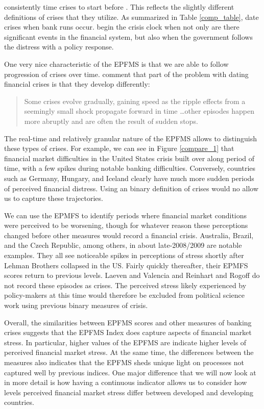 \documentclass[]{article}
\begin{document}
\cite{Reinhart2009} consistently time crises to start before \cite{laeven2013}. This reflects the slightly different definitions of crises that they utilize. As summarized in Table \ref{comp_table}, \cite{Reinhart2009} date crises when bank runs occur. \cite{laeven2013} begin the crisis clock when not only are there significant events in the financial system, but also when the government follows the distress with a policy response.

One very nice characteristic of the EPFMS is that we are able to follow
progression of crises over time. \cite[227]{laeven2013} comment
that part of the problem with dating financial crises is that they
develop differently:

\begin{quote}
    Some crises evolve gradually, gaining speed as the ripple effects from a seemingly small shock propagate forward in time \ldots other episodes happen more abruptly and are often the result of sudden stops.
\end{quote}

The real-time and relatively granular nature of the EPFMS allows to
distinguish these types of crises. For example, we can see in Figure
\ref{compare_1} that financial market difficulties in the United States
crisis built over along period of time, with a few spikes during notable
banking difficulties. Conversely, countries such as Germany, Hungary,
and Iceland clearly have much more sudden periods of perceived financial
distress. Using an binary definition of crises would no allow us to
capture these trajectories.

We can use the EPMFS to identify periods where financial market
conditions were perceived to be worsening, though for whatever reason
these perceptions changed before other measures would record a financial
crisis. Australia, Brazil, and the Czech Republic, among others, in
about late-2008/2009 are notable examples. They all see noticeable
spikes in perceptions of stress shortly after Lehman Brothers collapsed
in the US. Fairly quickly thereafter, their EPMFS scores return to
previous levels. Laeven and Valencia and Reinhart and Rogoff do not
record these episodes as crises. The perceived stress likely experienced
by policy-makers at this time would therefore be excluded from political
science work using previous binary measures of crisis.

Overall, the similarities between EPFMS scores and other measures of
banking crises suggests that the EPFMS Index does capture aspects of
financial market stress. In particular, higher values of the EPFMS are
indicate higher levels of perceived financial market stress. At the same
time, the differences between the measures also indicates that the EPFMS
sheds unique light on processes not captured well by previous indices.
One major difference that we will now look at in more detail is how
having a continuous indicator allows us to consider how levels perceived
financial market stress differ between developed and developing
countries.
\end{document}

